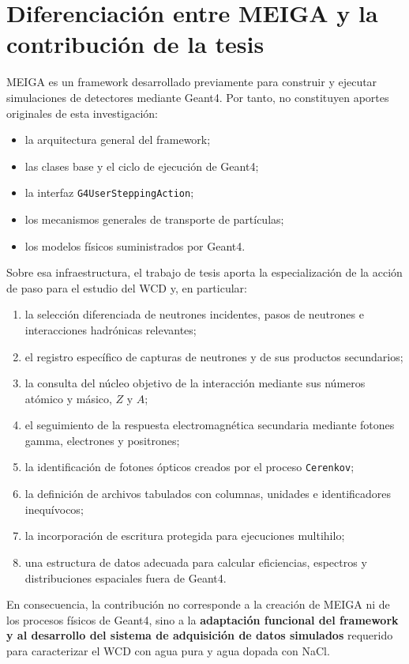 \documentclass[11pt,a4paper]{article}
\newcommand{\codigo}[1]{\nolinkurl{#1}}
\begin{document}
\section{Diferenciación entre MEIGA y la contribución de la tesis}

MEIGA es un framework desarrollado previamente para construir y ejecutar
simulaciones de detectores mediante Geant4. Por tanto, no constituyen aportes
originales de esta investigación:

\begin{itemize}
  \item la arquitectura general del framework;
  \item las clases base y el ciclo de ejecución de Geant4;
  \item la interfaz \codigo{G4UserSteppingAction};
  \item los mecanismos generales de transporte de partículas;
  \item los modelos físicos suministrados por Geant4.
\end{itemize}

Sobre esa infraestructura, el trabajo de tesis aporta la especialización de la
acción de paso para el estudio del WCD y, en particular:

\begin{enumerate}
  \item la selección diferenciada de neutrones incidentes, pasos de neutrones e   interacciones hadrónicas relevantes;
  \item el registro específico de capturas de neutrones y de sus productos secundarios;
  \item la consulta del núcleo objetivo de la interacción mediante sus números  atómico y másico, $Z$ y $A$;
  \item el seguimiento de la respuesta electromagnética secundaria mediante fotones gamma, electrones y positrones;
  \item la identificación de fotones ópticos creados por el proceso \codigo{Cerenkov};
  \item la definición de archivos tabulados con columnas, unidades e identificadores inequívocos;
  \item la incorporación de escritura protegida para ejecuciones multihilo;
  \item una estructura de datos adecuada para calcular eficiencias, espectros y distribuciones espaciales fuera de Geant4.
\end{enumerate}

En consecuencia, la contribución no corresponde a la creación de MEIGA ni de los procesos físicos de Geant4, sino a la \textbf{adaptación funcional del framework y al desarrollo del sistema de adquisición de datos simulados} requerido para caracterizar el WCD con agua pura y agua dopada con NaCl.
\end{document}
